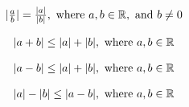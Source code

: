 \begin{equation}
  \begin{array}{c}
    |\frac{a}{b}| = \frac{|a|}{|b|} , \text{ where } a,b \in \mathbb{R}, \text{ and } b \neq 0
  \end{array}
\end{equation}

\begin{equation}
  \begin{array}{c}
    | a + b| \leq |a| + |b| , \text{ where } a,b \in \mathbb{R}
  \end{array}
\end{equation}

\begin{equation}
  \begin{array}{c}
    | a - b| \leq |a| + |b|,  \text{ where } a,b \in \mathbb{R}
  \end{array}
\end{equation}

\begin{equation}
  \begin{array}{c}
    |a| - |b| \leq |a - b|,  \text{ where } a,b \in \mathbb{R}
  \end{array} 
\end{equation}
